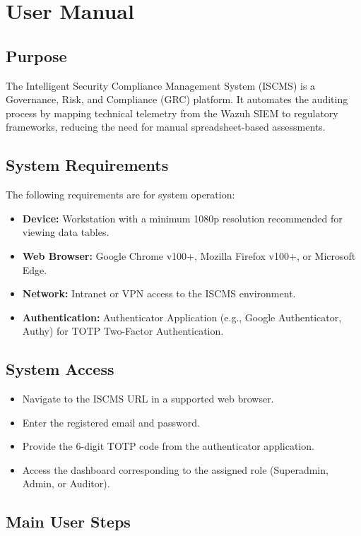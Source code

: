 \chapter{User Manual}

\section{Purpose}
The Intelligent Security Compliance Management System (ISCMS) is a Governance, Risk, and Compliance (GRC) platform. It automates the auditing process by mapping technical telemetry from the Wazuh SIEM to regulatory frameworks, reducing the need for manual spreadsheet-based assessments.

\section{System Requirements}
The following requirements are for system operation:
\begin{itemize}
    \item \textbf{Device:} Workstation with a minimum 1080p resolution recommended for viewing data tables.
    \item \textbf{Web Browser:} Google Chrome v100+, Mozilla Firefox v100+, or Microsoft Edge.
    \item \textbf{Network:} Intranet or VPN access to the ISCMS environment.
    \item \textbf{Authentication:} Authenticator Application (e.g., Google Authenticator, Authy) for TOTP Two-Factor Authentication.
\end{itemize}

\section{System Access}
\begin{itemize}
    \item Navigate to the ISCMS URL in a supported web browser.
    \item Enter the registered email and password.
    \item Provide the 6-digit TOTP code from the authenticator application.
    \item Access the dashboard corresponding to the assigned role (Superadmin, Admin, or Auditor).
\end{itemize}

\section{Main User Steps}

